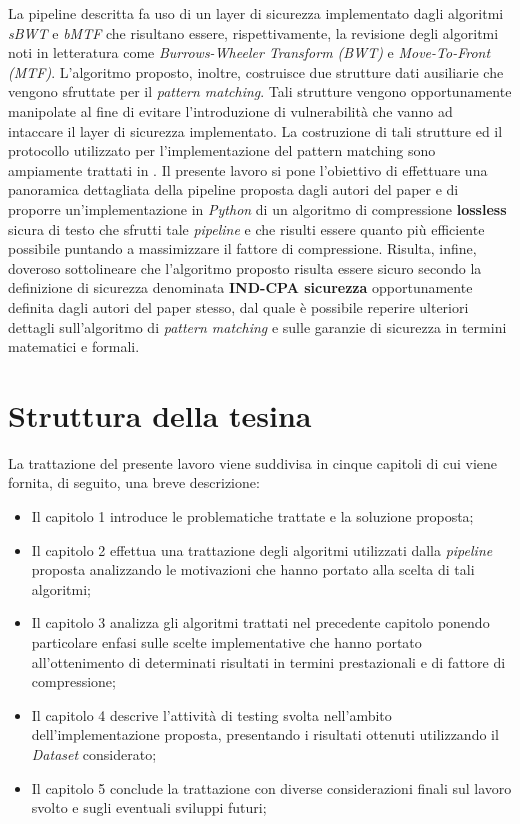 {La pipeline descritta fa uso di un layer di sicurezza implementato dagli algoritmi \emph{sBWT} e \emph{bMTF} che risultano essere, rispettivamente, la revisione degli algoritmi noti in letteratura come \emph{Burrows-Wheeler Transform (BWT)} e \emph{Move-To-Front (MTF)}. L'algoritmo proposto, inoltre, costruisce due strutture dati ausiliarie che vengono sfruttate per il \emph{pattern matching}. Tali strutture vengono opportunamente manipolate al fine di evitare l'introduzione di vulnerabilità che vanno ad intaccare il layer di sicurezza implementato. La costruzione di tali strutture ed il protocollo utilizzato per l'implementazione del pattern matching sono ampiamente trattati in \cite{zeng2018secure}. Il presente lavoro si pone l'obiettivo di effettuare una panoramica dettagliata della pipeline proposta dagli autori del paper \cite{zeng2018secure} e di proporre un'implementazione in \emph{Python} di un algoritmo di compressione \textbf{lossless} sicura di testo che sfrutti tale \emph{pipeline} e che risulti essere quanto più efficiente possibile puntando a massimizzare il fattore di compressione. Risulta, infine, doveroso sottolineare che l'algoritmo proposto risulta essere sicuro secondo la definizione di sicurezza denominata \textbf{IND-CPA sicurezza} opportunamente definita dagli autori del paper \cite{zeng2018secure} stesso, dal quale è possibile reperire ulteriori dettagli sull'algoritmo di \emph{pattern matching} e sulle garanzie di sicurezza in termini matematici e formali.
\section{Struttura della tesina} 
La trattazione del presente lavoro viene suddivisa in cinque capitoli di cui viene fornita, di seguito, una breve descrizione:
\begin{itemize}
    \item Il capitolo 1 introduce le problematiche trattate e la soluzione proposta;
    \item Il capitolo 2 effettua una trattazione degli algoritmi utilizzati dalla \emph{pipeline} proposta analizzando le motivazioni che hanno portato alla scelta di tali algoritmi;
    \item Il capitolo 3 analizza gli algoritmi trattati nel precedente capitolo ponendo particolare enfasi sulle scelte implementative che hanno portato all'ottenimento di determinati risultati in termini prestazionali e di fattore di compressione;
    \item Il capitolo 4 descrive l'attività di testing svolta nell'ambito dell'implementazione proposta, presentando i risultati ottenuti utilizzando il \emph{Dataset} considerato;
    \item Il capitolo 5 conclude la trattazione con diverse considerazioni finali sul lavoro svolto e sugli eventuali sviluppi futuri;
\end{itemize}
}